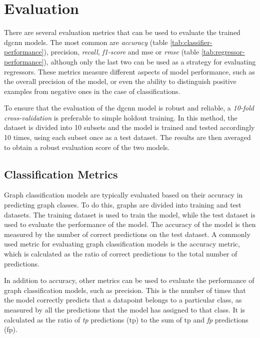 \documentclass[a4paper, 12pt]{report}
\begin{document}
\section{Evaluation}\label{sec:evaluation}

There are several evaluation metrics that can be used to evaluate the trained \acrshort{dgcnn} models. The most common are \textit{accuracy} (table \ref{tab:classifier-performance}), \gls{precision}, \textit{\gls{recall}}, \textit{\gls{f1-score}} and \acrlong{mse} or \textit{\acrlong{rmse}} (table \ref{tab:regressor-performance}), although only the last two can be used as a strategy for evaluating regressors. These metrics measure different aspects of model performance, such as the overall \gls{precision} of the model, or even the ability to distinguish positive examples from negative ones in the case of classifications.

To ensure that the evaluation of the \acrshort{dgcnn} model is robust and reliable, a \textit{\gls{10-fold cross-validation}} is preferable to simple \gls{holdout} training. In this method, the dataset is divided into 10 subsets and the model is trained and tested accordingly 10 times, using each subset once as a test dataset. The results are then averaged to obtain a robust evaluation score of the two models.

\subsection{Classification Metrics}\label{subsec:classification-metrics}

Graph classification models are typically evaluated based on their accuracy in predicting graph classes. To do this, graphs are divided into training and test datasets. The training dataset is used to train the model, while the test dataset is used to evaluate the performance of the model. The accuracy of the model is then measured by the number of correct predictions on the test dataset. A commonly used metric for evaluating graph classification models is the accuracy metric, which is calculated as the ratio of correct predictions to the total number of predictions.

In addition to accuracy, other metrics can be used to evaluate the performance of graph classification models, such as \gls{precision}. This is the number of times that the model correctly predicts that a datapoint belongs to a particular class, as measured by all the predictions that the model has assigned to that class. It is calculated as the ratio of \textit{\acrlong{tp}} predictions (\acrshort{tp}) to the sum of \acrshort{tp} and \textit{\acrlong{fp}} predictions (\acrshort{fp}).
\end{document}

